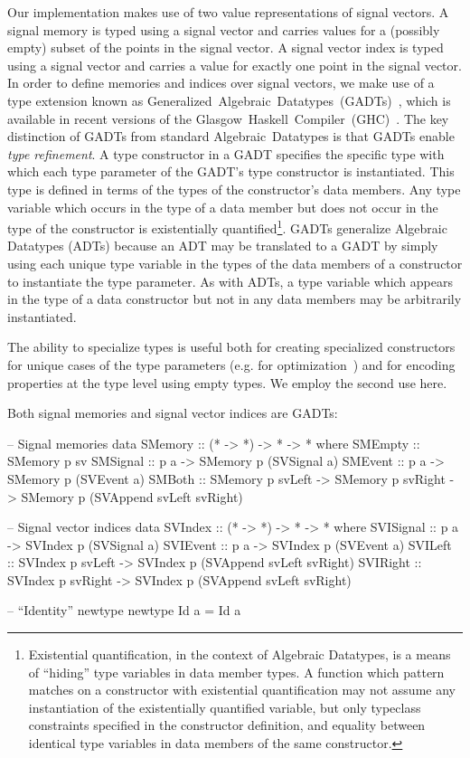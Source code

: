 Our implementation makes use of two value representations of signal vectors.
A signal memory is typed using a signal vector and carries values for a
(possibly empty) subset of the points in the signal vector. A signal vector
index is typed using a signal vector and carries a value for exactly one point
in the signal vector. In order to define memories and indices over signal
vectors, we make use of a type extension known as
Generalized~Algebraic~Datatypes~(GADTs)~\cite{Cheney2003,Xi2003}, which is
available in recent versions of the
Glasgow~Haskell~Compiler~(GHC)~\cite{PeytonJones2006}. The key distinction
of GADTs from standard Algebraic~Datatypes is that GADTs enable 
{\em type refinement}. A type constructor in a GADT specifies the specific type
with which each type parameter of the GADT's type constructor is instantiated.
This type is defined in terms of the types of the constructor's data members.
Any type variable which occurs in the type of a data member but does not occur
in the type of the constructor is existentially quantified\footnote{Existential
quantification, in the context of Algebraic Datatypes, is a means of ``hiding''
type variables in data member types. A function which pattern matches on a
constructor with existential quantification may not assume any instantiation of
the existentially quantified variable, but only typeclass constraints specified
in the constructor definition, and equality between identical type variables in
data members of the same constructor.}. GADTs generalize Algebraic Datatypes 
(ADTs) because an ADT may be translated to a GADT by simply using each unique
type variable in the types of the data members of a constructor to instantiate
the type parameter. As with ADTs, a type variable which appears in the type of a
data constructor but not in any data members may be arbitrarily instantiated.

The ability to specialize types is useful both for creating specialized
constructors for unique cases of the type parameters (e.g. for
optimization~\cite{Nilsson2005}) and for encoding properties at the type level
using empty types. We employ the second use here.%

Both signal memories and signal vector indices are GADTs:

\begin{code}
-- Signal memories
data SMemory :: (* -> *) -> * -> * where
  SMEmpty  :: SMemory p sv
  SMSignal :: p a -> SMemory p (SVSignal a)
  SMEvent  :: p a -> SMemory p (SVEvent a)
  SMBoth   :: SMemory p svLeft -> SMemory p svRight 
           -> SMemory p (SVAppend svLeft svRight)

-- Signal vector indices
data SVIndex :: (* -> *) -> * -> * where
  SVISignal :: p a -> SVIndex p (SVSignal a)
  SVIEvent  :: p a -> SVIndex p (SVEvent a)
  SVILeft   :: SVIndex p svLeft -> SVIndex p (SVAppend svLeft svRight)
  SVIRight  :: SVIndex p svRight -> SVIndex p (SVAppend svLeft svRight)

-- ``Identity'' newtype
newtype Id a = Id a
\end{code}

